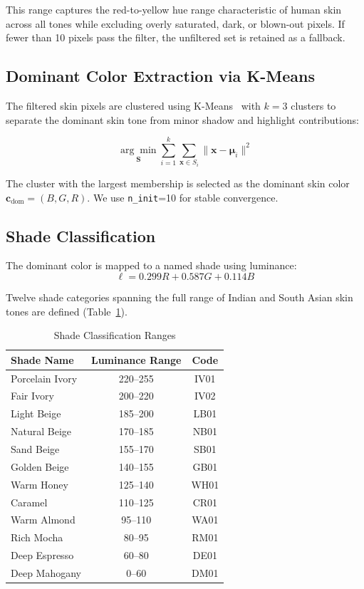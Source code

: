 \documentclass[conference]{IEEEtran}
\begin{document}
This range captures the red-to-yellow hue range characteristic of human skin across all tones while excluding overly saturated, dark, or blown-out pixels. If fewer than 10 pixels pass the filter, the unfiltered set is retained as a fallback.

\subsection{Dominant Color Extraction via K-Means}

The filtered skin pixels are clustered using K-Means~\cite{lloyd1982} with $k = 3$ clusters to separate the dominant skin tone from minor shadow and highlight contributions:

\begin{equation}
\underset{\mathbf{S}}{\arg\min} \sum_{i=1}^{k} \sum_{\mathbf{x} \in S_i} \| \mathbf{x} - \boldsymbol{\mu}_i \|^2
\label{eq:kmeans}
\end{equation}

The cluster with the largest membership is selected as the dominant skin color $\mathbf{c}_{\text{dom}} = (B, G, R)$. We use \texttt{n\_init}=10 for stable convergence.

\subsection{Shade Classification}

The dominant color is mapped to a named shade using luminance:
\begin{equation}
\ell = 0.299R + 0.587G + 0.114B
\label{eq:luminance}
\end{equation}

Twelve shade categories spanning the full range of Indian and South Asian skin tones are defined (Table~\ref{tab:shade_ranges}).

\begin{table}[t]
\centering
\caption{Shade Classification Ranges}
\label{tab:shade_ranges}
\begin{tabular}{lcc}
\toprule
\textbf{Shade Name} & \textbf{Luminance Range} & \textbf{Code} \\
\midrule
Porcelain Ivory & 220--255 & IV01 \\
Fair Ivory & 200--220 & IV02 \\
Light Beige & 185--200 & LB01 \\
Natural Beige & 170--185 & NB01 \\
Sand Beige & 155--170 & SB01 \\
Golden Beige & 140--155 & GB01 \\
Warm Honey & 125--140 & WH01 \\
Caramel & 110--125 & CR01 \\
Warm Almond & 95--110 & WA01 \\
Rich Mocha & 80--95 & RM01 \\
Deep Espresso & 60--80 & DE01 \\
Deep Mahogany & 0--60 & DM01 \\
\bottomrule
\end{tabular}
\end{table}
\end{document}
